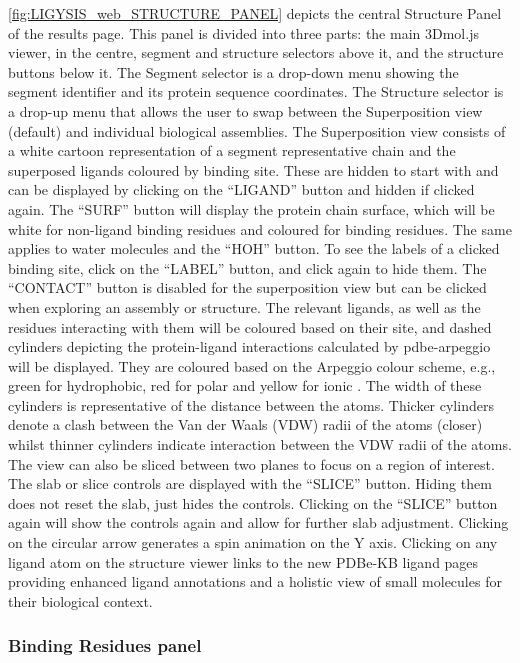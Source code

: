 \autoref{fig:LIGYSIS_web_STRUCTURE_PANEL} depicts the central Structure Panel of the results page. This panel is divided into three parts: the main 3Dmol.js viewer, in the centre, segment and structure selectors above it, and the structure buttons below it. The Segment selector  is a drop-down menu showing the segment identifier and its protein sequence coordinates. The Structure selector is a drop-up menu that allows the user to swap between the Superposition view (default) and individual biological assemblies. The Superposition view consists of a white cartoon representation of a segment representative chain and the superposed ligands coloured by binding site. These are hidden to start with and can be displayed by clicking on the ``LIGAND'' button and hidden if clicked again. The ``SURF'' button will display the protein chain surface, which will be white for non-ligand binding residues and coloured for binding residues. The same applies to water molecules and the ``HOH'' button. To see the labels of a clicked binding site, click on the ``LABEL'' button, and click again to hide them. The ``CONTACT'' button is disabled for the superposition view but can be clicked when exploring an assembly or structure. The relevant ligands, as well as the residues interacting with them will be coloured based on their site, and dashed cylinders depicting the protein-ligand interactions calculated by pdbe-arpeggio will be displayed. They are coloured based on the Arpeggio colour scheme, e.g., green for hydrophobic, red for polar and yellow for ionic \cite{JUBB_2017_ARPEGGIO}. The width of these cylinders is representative of the distance between the atoms. Thicker cylinders denote a clash between the Van der Waals (VDW) radii of the atoms (closer) whilst thinner cylinders indicate interaction between the VDW radii of the atoms. The view can also be sliced between two planes to focus on a region of interest. The slab or slice controls are displayed with the ``SLICE'' button. Hiding them does not reset the slab, just hides the controls. Clicking on the ``SLICE'' button again will show the controls again and allow for further slab adjustment. Clicking on the circular arrow generates a spin animation on the Y axis. Clicking on any ligand atom on the structure viewer links to the new PDBe-KB ligand pages \cite{CHOUDHARY_2024_PDBETOOLS} providing enhanced ligand annotations and a holistic view of small molecules for their biological context.

\subsubsection{Binding Residues panel}

